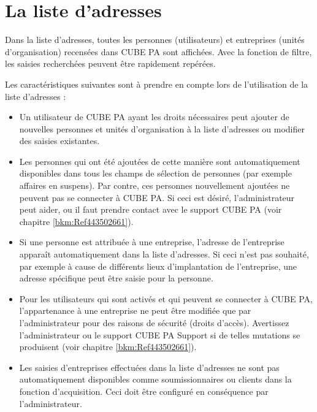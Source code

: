 
\clearpage
\section{La liste d'adresses}
\label{bkm:Ref443738751}
Dans la liste d'adresses, toutes les personnes (utilisateurs) et entreprises (unités d'organisation) recensées dans CUBE PA sont affichées. Avec la fonction de filtre, les saisies recherchées peuvent être rapidement repérées.

\vspace{\baselineskip}

Les caractéristiques suivantes sont à prendre en compte lors de l'utilisation de la liste d'adresses :

\begin{itemize}
\item
Un utilisateur de CUBE PA ayant les droits nécessaires peut ajouter de nouvelles personnes et unités d'organisation à la liste d'adresses ou modifier des saisies existantes.

\item
Les personnes qui ont été ajoutées de cette manière sont automatiquement disponibles dans tous les champs de sélection de personnes (par exemple affaires en suspens). Par contre, ces personnes nouvellement ajoutées ne peuvent pas se connecter à CUBE PA. Si ceci est désiré, l'administrateur peut aider, ou il faut prendre contact avec le support CUBE PA (voir chapitre \ref{bkm:Ref443502661}).

\item
Si une personne est attribuée à une entreprise, l'adresse de l'entreprise apparaît automatiquement dans la liste d'adresses. Si ceci n'est pas souhaité, par exemple à cause de différents lieux d'implantation de l'entreprise, une adresse spécifique peut être saisie pour la personne.

\item
Pour les utilisateurs qui sont activés et qui peuvent se connecter à CUBE PA, l'appartenance à une entreprise ne peut être modifiée que par l'administrateur pour des raisons de sécurité (droits d'accès). Avertissez l'administrateur ou le support CUBE PA Support si de telles mutations se produisent (voir chapitre \ref{bkm:Ref443502661}).

\item
Les saisies d'entreprises effectuées dans la liste d'adresses ne sont pas automatiquement disponibles comme soumissionnaires ou clients dans la fonction d'acquisition. Ceci doit être configuré en conséquence par l'administrateur.
\end{itemize}

